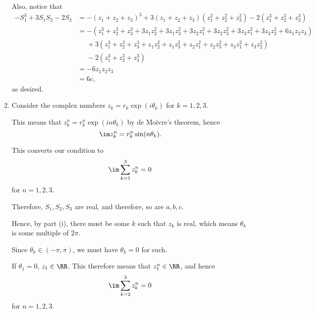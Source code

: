 \begin{enumerate}
          Also, notice that
          \begin{align*}
              -S_1^3 + 3 S_1 S_2 - 2 S_3 & = - (z_1 + z_2 + z_3)^3 + 3 (z_1 + z_2 + z_3) (z_1^2 + z_2^2 + z_3^2) - 2(z_1^3 + z_2^3 + z_3^3)                             \\
                                         & = -(z_1^3 + z_2^3 + z_3^3 + 3z_1 z_2^2 + 3z_1 z_3^2 + 3 z_2 z_1^2 + 3 z_2 z_3^2 + 3 z_3 z_1^2 + 3 z_3 z_2^2 + 6 z_1 z_2 z_3) \\
                                         & \phantom{=} + 3(z_1^3 + z_2^3 + z_3^3 + z_1 z_2^2 + z_1 z_3^2 + z_2 z_1^2 + z_2 z_3^2 + z_3 z_1^2 + z_3 z_2^2)               \\
                                         & \phantom{=} - 2(z_1^3 + z_2^3 + z_3^3)                                                                                       \\
                                         & = -6 z_1 z_2 z_3                                                                                                             \\
                                         & = 6c,
          \end{align*}
          as desired.

    \item Consider the complex numbers \(z_k = r_k \exp (i \theta_k)\) for \(k = 1, 2, 3\).

          This means that \(z_k^n = r_k^n \exp (i n \theta_k)\) by de Moivre's theorem, hence
          \[
              \im z_k^n = r_k^n \sin (n \theta_k).
          \]

          This converts our condition to
          \begin{align*}
              \im \sum_{k = 1}^{3} z_k^n = 0
          \end{align*}
          for \(n = 1, 2, 3\).

          Therefore, \(S_1, S_2, S_3\) are real, and therefore, so are \(a, b, c\).

          Hence, by part (i), there must be some \(k\) such that \(z_k\) is real, which means \(\theta_k\) is some multiple of \(2\pi\).

          Since \(\theta_k \in (-\pi, \pi)\), we must have \(\theta_k = 0\) for such.

          If \(\theta_1 = 0\), \(z_1 \in \RR\). This therefore means that \(z_1^n \in \RR\), and hence
          \[
              \im \sum_{k = 2}^{3} z_k^n = 0
          \]
          for \(n = 1, 2, 3\).


\end{enumerate}

